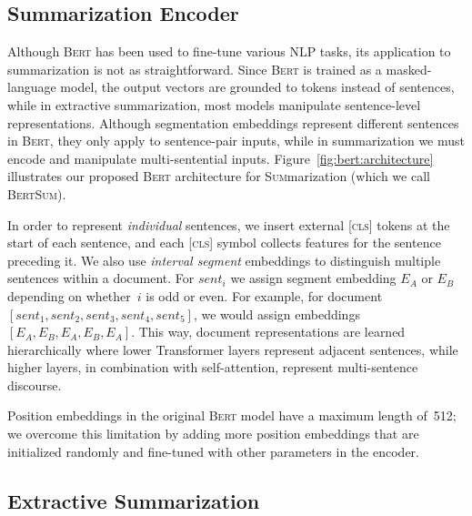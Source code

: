 \documentclass[11pt,a4paper]{article}
\begin{document}
    \subsection{Summarization Encoder}
    \label{sec:summ-encod}
    
    Although \textsc{Bert} has been used to fine-tune various NLP tasks,
    its application to summarization is not as straightforward.  Since
    \textsc{Bert} is trained as a masked-language model, the output
    vectors are grounded to tokens instead of sentences, while in
    extractive summarization, most models manipulate sentence-level
    representations.  Although segmentation embeddings represent different
    sentences in \textsc{Bert}, they only apply to sentence-pair inputs,
    while in summarization we must encode and manipulate multi-sentential
    inputs.  Figure~\ref{fig:bert:architecture} illustrates our proposed
    \textsc{Bert} architecture for \textsc{Sum}marization (which we call
    \textsc{BertSum}).
    
    
    
    
    In order to represent \emph{individual} sentences, we insert
    external [\textsc{cls}] tokens at the start of each sentence, and
    each [\textsc{cls}] symbol collects features for the sentence
    preceding it. We also use \emph{interval segment} embeddings to
    distinguish multiple sentences within a document. For $sent_i$ we
    assign segment embedding $E_A$ or $E_B$ depending on whether~$i$
    is odd or even. For example, for document $[sent_1, sent_2,
    sent_3, sent_4, sent_5]$, we would assign embeddings $[E_A, E_B,
    E_A,E_B, E_A]$. This way, document representations are learned
    hierarchically where lower Transformer layers represent adjacent
    sentences, while higher layers, in combination with
    self-attention, represent multi-sentence discourse.
    
    
    
    Position embeddings in the original \textsc{Bert} model have a maximum
    length of~512; we overcome this limitation by adding more position
    embeddings that are initialized randomly and fine-tuned with other
    parameters in the encoder.
    
    
    
    
    
    \subsection{Extractive Summarization}
    \label{sec:extr-summ}
    
\end{document}
